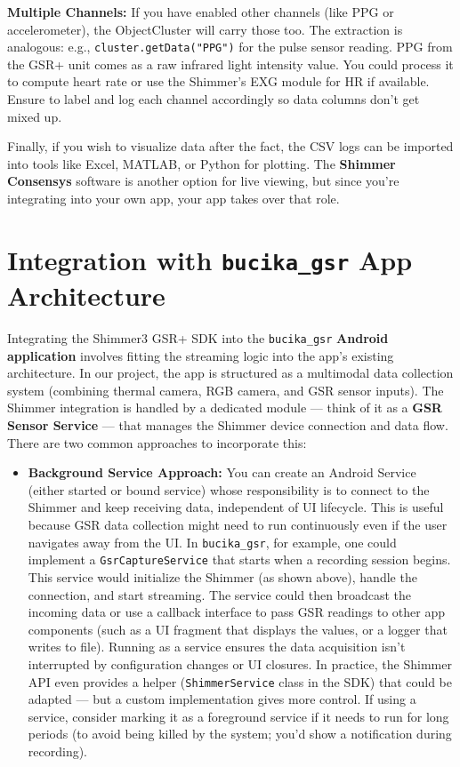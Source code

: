 {{\textbf{Multiple Channels:} If you have enabled other channels (like PPG or
accelerometer), the ObjectCluster will carry those too. The extraction
is analogous: e.g., \texttt{cluster.getData("PPG")} for the pulse sensor
reading. PPG from the GSR+ unit comes as a raw infrared light intensity
value. You could process it to compute heart rate or use the Shimmer's
EXG module for HR if available. Ensure to label and log each channel
accordingly so data columns don't get mixed up.

Finally, if you wish to visualize data after the fact, the CSV logs can
be imported into tools like Excel, MATLAB, or Python for plotting. The
\textbf{Shimmer Consensys} software is another option for live viewing, but
since you're integrating into your own app, your app takes over that
role.

\section{Integration with \texttt{bucika_gsr} App Architecture}

Integrating the Shimmer3 GSR+ SDK into the \texttt{bucika_gsr} \textbf{Android
application} involves fitting the streaming logic into the app's
existing architecture. In our project, the app is structured as a
multimodal data collection system (combining thermal camera, RGB camera,
and GSR sensor
inputs)\cite{CortisolStressIndicator2020}.
The Shimmer integration is handled by a dedicated module --- think of it
as a \textbf{GSR Sensor Service} --- that manages the Shimmer device
connection and data flow. There are two common approaches to incorporate
this:

\begin{itemize}
\item \textbf{Background Service Approach:} You can create an Android Service
  (either started or bound service) whose responsibility is to connect
  to the Shimmer and keep receiving data, independent of UI lifecycle.
  This is useful because GSR data collection might need to run
  continuously even if the user navigates away from the UI. In
  \texttt{bucika_gsr}, for example, one could implement a \texttt{GsrCaptureService}
  that starts when a recording session begins. This service would
  initialize the Shimmer (as shown above), handle the connection, and
  start streaming. The service could then broadcast the incoming data or
  use a callback interface to pass GSR readings to other app components
  (such as a UI fragment that displays the values, or a logger that
  writes to file). Running as a service ensures the data acquisition
  isn't interrupted by configuration changes or UI closures. In
  practice, the Shimmer API even provides a helper (\texttt{ShimmerService}
  class in the SDK) that could be adapted --- but a custom implementation
  gives more control. If using a service, consider marking it as a
  foreground service if it needs to run for long periods (to avoid being
  killed by the system; you'd show a notification during recording).


\end{itemize}}}
